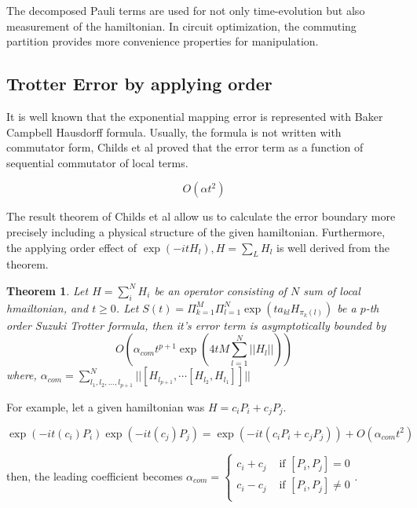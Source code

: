 \documentclass[a4paper,12pt]{article}
\newtheorem{theorem}{Theorem}
\begin{document}
The decomposed Pauli terms are used for not only time-evolution
but also measurement of the hamiltonian.
In circuit optimization, the commuting partition 
provides more convenience properties for manipulation.

\subsection{Trotter Error by applying order}

It is well known that the exponential mapping error is represented with Baker Campbell Hausdorff formula.
Usually, the formula is not written with commutator form, Childs et al proved that the error term 
as a function of sequential commutator of local terms\cite{childs_theory_2021}.

\begin{equation}
    O(\alpha t^2)
\end{equation}

The result theorem of Childs et al allow us to calculate 
the error boundary more precisely including a physical structure 
of the given hamiltonian.
Furthermore, the applying order effect of $\exp(-it H_l), H = \sum_L H_l$ 
is well derived from the theorem.

\begin{theorem}
    Let $H = \sum_i^N H_i$ be an operator consisting of $N$ sum of local hmailtonian,
    and $t\geq 0$.
    Let $S(t) = \Pi_{k=1}^M \Pi_{l=1}^N \exp(t a_{kl} H_{\pi_k(l)})$ be a $p$-th order
    Suzuki Trotter formula, then it's error term is asymptotically bounded by
    \begin{equation}
        O(\alpha_{com} t^{p+1} \exp(4t M \sum_{l=1}^N || H_l||))
    \end{equation}
    where, $\alpha_{com} = \sum_{l_1, l_2, \dots , l_{p+1}}^N || [H_{l_{p+1}}, \cdots [H_{l_2}, H_{l_1}]]||$
\end{theorem}

For example, let a given hamiltonian was $H = c_i P_i + c_j P_j$.

\begin{equation}
    \exp(-it (c_i) P_i) \exp(-it (c_j) P_j) = \exp(- it (c_i P_i + c_j P_j)) + O (\alpha_{com}t^2)
\end{equation}

then, the leading coefficient becomes $\alpha_{com} = \begin{cases}
    c_i + c_j & \mbox{ if } [P_i, P_j] = 0 \\
    c_i - c_j & \mbox{ if } [P_i, P_j] \neq 0 \\
\end{cases}$.
\end{document}
